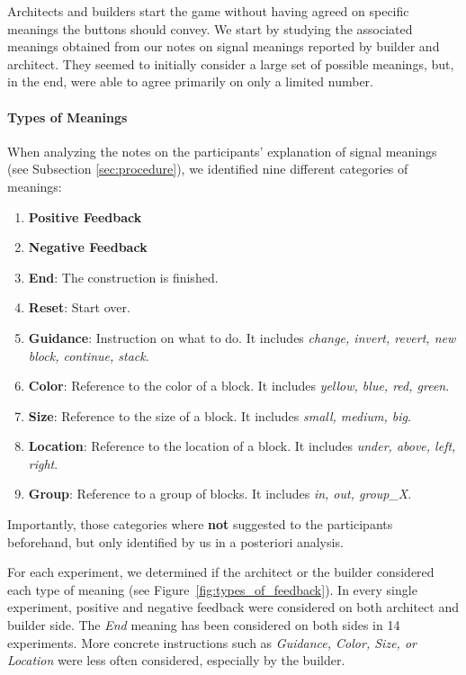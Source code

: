Architects and builders start the game without having agreed on specific meanings the buttons should convey. We start by studying the associated meanings obtained from our notes on signal meanings reported by builder and architect. They seemed to initially consider a large set of possible meanings, but, in the end, were able to agree primarily on only a limited number.

\paragraph{Types of Meanings} 
When analyzing the notes on the participants' explanation of signal meanings (see Subsection \ref{sec:procedure}), we identified nine different categories of meanings:
\begin{enumerate}
    \item \textbf{Positive Feedback}
    \item \textbf{Negative Feedback}
    \item \textbf{End}: The construction is finished.
    \item \textbf{Reset}: Start over.
    \item \textbf{Guidance}: Instruction on what to do. It includes \emph{change, invert, revert, new block, continue, stack}. 
    \item \textbf{Color}: Reference to the color of a block. It includes \emph{yellow, blue, red, green}.
    \item \textbf{Size}: Reference to the size of a block. It includes \emph{small, medium, big}.
    \item \textbf{Location}: Reference to the location of a block. It includes \emph{under, above, left, right}.
    \item \textbf{Group}: Reference to a group of blocks. It includes \emph{in, out, group\_X}.
\end{enumerate}
Importantly, those categories where \textbf{not} suggested to the participants beforehand, but only identified by us in a posteriori analysis.

For each experiment, we determined if the architect or the builder considered each type of meaning (see Figure~\ref{fig:types_of_feedback}). In every single experiment, positive and negative feedback were considered on both architect and builder side. The \emph{End} meaning has been considered on both sides in 14 experiments. More concrete instructions such as \emph{Guidance, Color, Size, or Location} were less often considered, especially by the builder.

